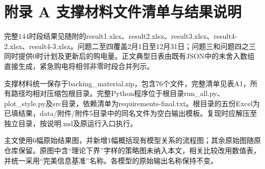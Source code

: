 \documentclass[UTF8,a4paper,zihao=-4,fontset=windows]{ctexart}
\begin{document}
\section{附录 A 支撑材料文件清单与结果说明}
完整144时段结果见随附的result1.xlsx、result2.xlsx、result3.xlsx、result4-2.xlsx、result4-3.xlsx。问题二至四覆盖2月1日至12月31日；问题三和问题四之三同时提供0时计划及更新后的购电量。正文典型日表由既有JSON中的未舍入数组直接生成，紧急购电将相邻非零时段合并列示。
\par
支撑材料统一保存于backing\_material.zip，包含76个文件，完整清单见表A1，所有路径均相对压缩包根目录。完整Python程序位于根目录run\_all.py、plot\_style.py及src目录，依赖清单为requirements-final.txt。根目录的五份Excel为已填结果，data/附件/附件5目录中的同名文件为空白输出模板。复现时应解压至独立目录，按说明.md及原运行入口执行。
\par
主文使用6幅原始结果图，并新增1幅概括现有模型关系的流程图；其余原始图随原仓库保留。原图中含“理论下界”字样的策略图未纳入本文，相关比较改用数值表，并统一采用“完美信息基准”名称。各模型的原始输出名称保持不变。
\par
\begingroup\fontsize{9.5}{12}\selectfont\renewcommand{\arraystretch}{1.15}
\end{document}
